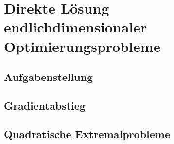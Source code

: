 %
%
%
\section{Direkte Lösung endlichdimensionaler Optimierungsprobleme
\label{buch:direkt:section:gradient}}

\subsection{Aufgabenstellung}

\subsection{Gradientabstieg}

\subsection{Quadratische Extremalprobleme}

